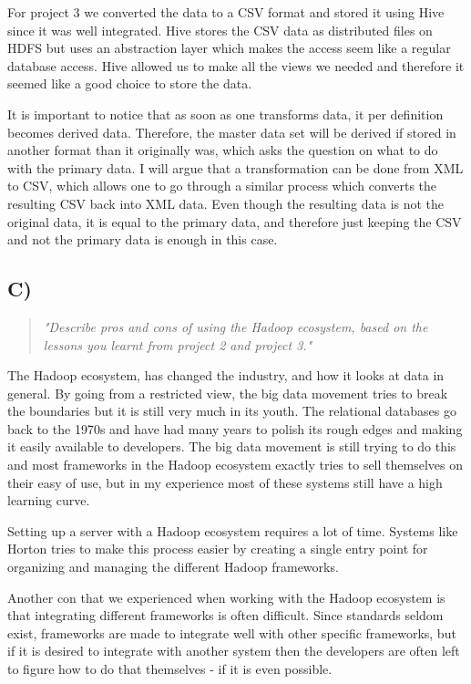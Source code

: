 \newpar For project 3 we converted the data to a CSV format and stored it using Hive since it was well integrated. Hive stores the CSV data as distributed files on HDFS but uses an abstraction layer which makes the access seem like a regular database access. Hive allowed us to make all the views we needed and therefore it seemed like a good choice to store the data. 

It is important to notice that as soon as one transforms data, it per definition becomes derived data. Therefore, the master data set will be derived if stored in another format than it originally was, which asks the question on what to do with the primary data. I will argue that a transformation can be done from XML to CSV, which allows one to go through a similar process which converts the resulting CSV back into XML data. Even though the resulting data is not the original data, it is equal to the primary data, and therefore just keeping the CSV and not the primary data is enough in this case.

\subsection{C)}
\begin{quote}
	\textit{"Describe	pros	and	cons	of	using	the	Hadoop	ecosystem,	based	on	the	lessons	you	learnt	from	project	2	and	project	3."}
\end{quote}
The Hadoop ecosystem, has changed the industry, and how it looks at data in general. By going from a restricted view, the big data movement tries to break the boundaries but it is still very much in its youth. The relational databases go back to the 1970s and have had many years to polish its rough edges and making it easily available to developers. The big data movement is still trying to do this and most frameworks in the Hadoop ecosystem exactly tries to sell themselves on their easy of use, but in my experience most of these systems still have a high learning curve. 

Setting up a server with a Hadoop ecosystem requires a lot of time. Systems like Horton tries to make this process easier by creating a single entry point for organizing and managing the different Hadoop frameworks.

\newpar Another con that we experienced when working with the Hadoop ecosystem is that integrating different frameworks is often difficult. Since standards seldom exist, frameworks are made to integrate well with other specific frameworks, but if it is desired to integrate with another system then the developers are often left to figure how to do that themselves - if it is even possible.

